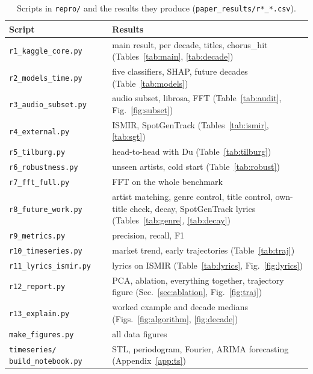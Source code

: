\begin{table}[!htbp]
\centering
\caption{Scripts in \texttt{repro/} and the results they produce (\texttt{paper\_results/r*\_*.csv}).}
\label{tab:scripts}
\footnotesize
\setlength{\tabcolsep}{3pt}
\begin{tabular}{@{}l>{\raggedright\arraybackslash}p{3.6cm}@{}}
\toprule
Script & Results \\
\midrule
\texttt{r1\_kaggle\_core.py} & main result, per decade, titles, chorus\_hit (Tables~\ref{tab:main}, \ref{tab:decade}) \\
\texttt{r2\_models\_time.py} & five classifiers, SHAP, future decades (Table~\ref{tab:models}) \\
\texttt{r3\_audio\_subset.py} & audio subset, librosa, FFT (Table~\ref{tab:audit}, Fig.~\ref{fig:subset}) \\
\texttt{r4\_external.py} & ISMIR, SpotGenTrack (Tables~\ref{tab:ismir}, \ref{tab:sgt}) \\
\texttt{r5\_tilburg.py} & head-to-head with Du (Table~\ref{tab:tilburg}) \\
\texttt{r6\_robustness.py} & unseen artists, cold start (Table~\ref{tab:robust}) \\
\texttt{r7\_fft\_full.py} & FFT on the whole benchmark \\
\texttt{r8\_future\_work.py} & artist matching, genre control, title control, own-title check, decay, SpotGenTrack lyrics (Tables~\ref{tab:genre}, \ref{tab:decay}) \\
\texttt{r9\_metrics.py} & precision, recall, F1 \\
\texttt{r10\_timeseries.py} & market trend, early trajectories (Table~\ref{tab:traj}) \\
\texttt{r11\_lyrics\_ismir.py} & lyrics on ISMIR (Table~\ref{tab:lyrics}, Fig.~\ref{fig:lyrics}) \\
\texttt{r12\_report.py} & PCA, ablation, everything together, trajectory figure (Sec.~\ref{sec:ablation}, Fig.~\ref{fig:traj}) \\
\texttt{r13\_explain.py} & worked example and decade medians (Figs.~\ref{fig:algorithm}, \ref{fig:decade}) \\
\texttt{make\_figures.py} & all data figures \\
\texttt{timeseries/} \texttt{build\_notebook.py} & STL, periodogram, Fourier, ARIMA forecasting (Appendix~\ref{app:ts}) \\
\bottomrule
\end{tabular}
\end{table}

